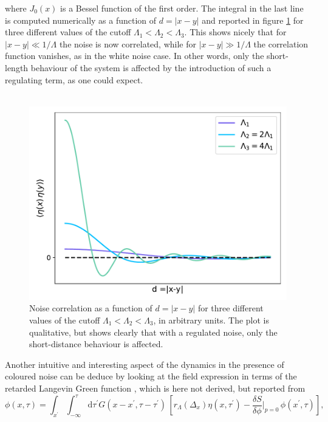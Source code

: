 where $J_0(x)$ is a Bessel function of the first order. The integral in the last line is computed numerically as a function of $d=|x-y|$ and reported in figure \ref{fig:bessel} for three different values of the cutoff $\Lambda_1 < \Lambda_2 < \Lambda_3$. This shows nicely that for $|x-y| \ll 1/\Lambda$ the noise is now correlated, while for $|x-y| \gg 1/\Lambda$ the correlation function vanishes, as in the white noise case. In other words, only the short-length behaviour of the system is affected by the introduction of such a regulating term, as one could expect.\\~\\
\begin{figure}
    \centering
    \includegraphics[scale=0.6]{figures/bessel.pdf}
    \caption[Correlated noise]{Noise correlation as a function of $d=|x-y|$ for three different values of the cutoff $\Lambda_1 < \Lambda_2 < \Lambda_3$, in arbitrary units. The plot is qualitative, but shows clearly that with a regulated noise, only the short-distance behaviour is affected.}
    \label{fig:bessel}
\end{figure}
Another intuitive and interesting aspect of the dynamics in the presence of coloured noise can be deduce by looking at the field expression in terms of the retarded Langevin Green function \cite{Damgaard1987StochasticQuantization}, which is here not derived, but reported from \cite{Pawlowski2017CoolingNoise}
\begin{equation*}
        \phi(x, \tau) = \int_{x^{\prime}} \int_{-\infty}^\tau \mathrm{d} \tau^{\prime} G\left(x-x^{\prime}, \tau-\tau^{\prime}\right) \, \left[r_{\Lambda}\left(\Delta_x\right) \eta\left(x, \tau^{\prime}\right)-\frac{\delta S}{\delta \phi}|_{p=0} \, \phi\left(x^{\prime}, \tau\right)\right],
\end{equation*}
